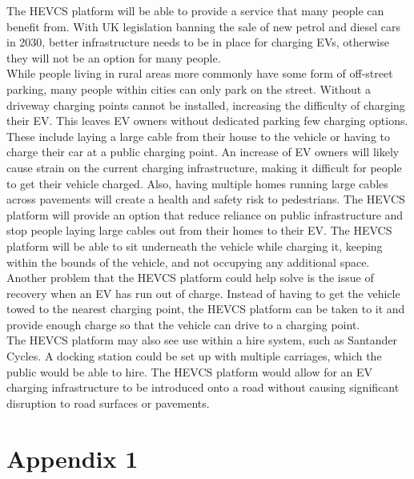 \documentclass [12pt]{article}
\begin{document}
The HEVCS platform will be able to provide a service that many people can benefit from. With UK legislation banning the sale of new petrol and diesel cars in 2030, better infrastructure needs to be in place for charging EVs, otherwise they will not be an option for many people.
\\
While people living in rural areas more commonly have some form of off-street parking, many people within cities can only park on the street. Without a driveway charging points cannot be installed, increasing the difficulty of charging their EV. This leaves EV owners without dedicated parking few charging options. These include laying a large cable from their house to the vehicle or having to charge their car at a public charging point. An increase of EV owners will likely cause strain on the current charging infrastructure, making it difficult for people to get their vehicle charged. Also, having multiple homes running large cables across pavements will create a health and safety risk to pedestrians. The HEVCS platform will provide an option that reduce reliance on public infrastructure and stop people laying large cables out from their homes to their EV.  The HEVCS platform will be able to sit underneath the vehicle while charging it, keeping within the bounds of the vehicle, and not occupying any additional space.
\\
Another problem that the HEVCS platform could help solve is the issue of recovery when an EV has run out of charge. Instead of having to get the vehicle towed to the nearest charging point, the HEVCS platform can be taken to it and provide enough charge so that the vehicle can drive to a charging point.
\\
The HEVCS platform may also see use within a hire system, such as Santander Cycles. A docking station could be set up with multiple carriages, which the public would be able to hire. The HEVCS platform would allow for an EV charging infrastructure to be introduced onto a road without causing significant disruption to road surfaces or pavements. 








\newpage



\newpage
\appendix

\section{Appendix 1}\label{app:appendix_1}
\end{document}
